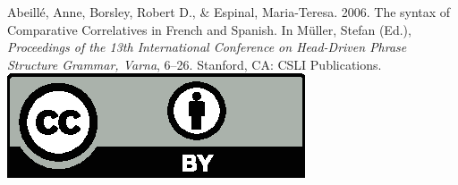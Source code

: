 \documentclass[a4paper,11pt]{article}
\begin{document}
\noindent



\vfill
\noindent
Abeillé, Anne, Borsley, Robert D., \& Espinal,  Maria-Teresa. 2006. The syntax of Comparative Correlatives in French and Spanish. In Müller, Stefan (Ed.), \emph{{Proceedings of the 13th International Conference on Head-Driven Phrase Structure Grammar, Varna}}, 6--26. Stanford,
CA: CSLI Publications. \hfill\href{http://creativecommons.org/licenses/by/4.0/}{\includegraphics[height=.75em]{Includes/ccby.eps}}

\newpage

        
\end{document}
